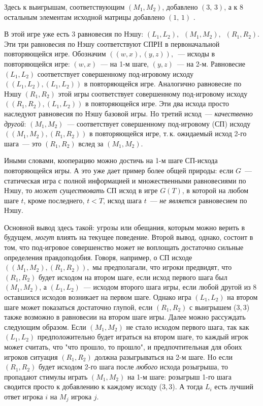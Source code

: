 Здесь к выигрышам, соответствующим $(M_1,M_2)$, добавлено $(3,\,3)$, а
к 8 остальным элементам исходной матрицы добавлено $(1,\,1)$ .

В этой игре уже есть 3 равновесия по Нэшу: $(L_1,L_2),$\, $(M_1,M_2),$\,
$(R_1,R_2).$ Эти три равновесия по Нэшу
соответствуют СПРH в первоначальной повторяющейся игре.
Обозначим $((w,x),(y,z)),$~--- исходы в повторяющейся игре:
$(w,x)$~--- на 1-м шаге, $(y,z)$~--- на 2-м. Равновесие $(L_1,L_2)$
соответствует совершенному под-игровому исходу
$((L_1,L_2),(L_1,L_2))$ в повторяющейся игре. Аналогично
равновесие по Нэшу $(R_1,R_2)$ этой игры соответствует
совершенному под-игровому исходу $((R_1,R_2),(L_1,L_2))$ в
повторяющейся игре. Эти два исхода просто наследуют равновесия
по Нэшу базовой игры. Hо третий исход~--- {\it качественно
другой}: $(M_1,M_2)$~--- соответствует совершенному под-игровому
(СП) исходу $((M_1,M_2),(R_1,R_2))$ в повторяющейся игре, т.\,к.
ожидаемый исход 2-го шага~--- это $(R_1,R_2)$ вслед за
$(M_1,M_2)$.

Иными словами, кооперацию можно достичь на 1-м шаге СП-исхода
повторяющейся игры.  А это уже дает пример более общей природы: если
$G$~--- статическая игра с полной информацией и множественными
равновесиями по Нэшу, то \emph{может существовать} СП исход в игре
$G(T)$, в которой на любом шаге $t$, кроме последнего, $t<T$, исход шага
$t$~---  \emph{не является} равновесием по Нэшу.

Основной вывод здесь такой: угрозы или обещания, которым можно
верить в будущем, {\it могут} влиять на текущее поведение.
Второй вывод, однако, состоит в том, что под-игровое совершенство
может не воплощать достаточно сильные определения правдоподобия.
Говоря, например, о СП исходе $((M_1,M_2),(R_1,R_2)),$ мы
предполагали, что игроки предвидят, что $(R_1,R_2)$ будет
исходом на втором шаге, если исход первого шага был
$(M_1,M_2)$, а $(L_1,L_2)$~--- исходом второго шага игры,
если любой другой из 8 оставшихся исходов возникает на первом шаге.
Однако игра $(L_1,L_2)$ на втором шаге может показаться достаточно
глупой, если $(R_1,R_2)$ с выигрышем (3,\,3) также возможно в
равновесии на втором шаге игры. Далее можно рассуждать следующим
образом. Если $(M_1,M_2)$ не стало исходом первого шага, так как
$(L_1,L_2)$ предположительно будет играться на втором шаге, то каждый
игрок может считать, что "что прошло, то прошло", и
предпочтительная для обоих игроков ситуация $(R_1,R_2)$
должна разыгрываться на 2-м шаге. Hо если $(R_1,R_2)$ будет
исходом 2-го шага после {\it любого} исхода розыгрыша,
то пропадают стимулы играть $(M_1,M_2)$ на 1-м шаге:
розыгрыш 1-го шага сводится просто к добавлению к каждому
исходу (3,\,3). А тогда $L_i$ есть лучший ответ игрока $i$ на
$M_j$ игрока $j$.

